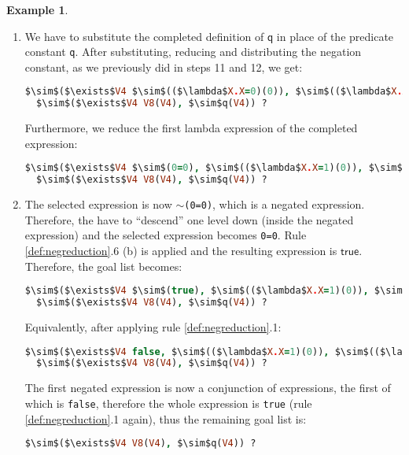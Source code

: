 \documentclass[inscr,ack,preface]{dithesis}
\theoremstyle{definition}
\newtheorem{example}{Example}[chapter]
\newcommand{\msf}[1]{$\mathsf{#1}$}
\begin{document}
\begin{example}
\begin{enumerate}
And after applying the unification, gives:
\begin{lstlisting}[language=Prolog,%
  frame=single,breaklines=false,mathescape=true]
  $\sim$($\exists$V4 $\sim$q(0)), $\sim$($\exists$V4 V8(V4), $\sim$q(V4)) ?
\end{lstlisting}

\item We have to substitute the completed definition of \msf{q} in place of the predicate constant \texttt{q}. After substituting, reducing and distributing the negation constant, as we previously did in steps 11 and 12, we get:
\begin{lstlisting}[language=Prolog,%
  frame=single,breaklines=false,mathescape=true]
  $\sim$($\exists$V4 $\sim$(($\lambda$X.X=0)(0)), $\sim$(($\lambda$X.X=1)(0)), $\sim$(($\lambda$X.X=2)(0))),
  $\sim$($\exists$V4 V8(V4), $\sim$q(V4)) ?
\end{lstlisting}

Furthermore, we reduce the first lambda expression of the completed expression:
\begin{lstlisting}[language=Prolog,%
  frame=single,breaklines=false,mathescape=true]
  $\sim$($\exists$V4 $\sim$(0=0), $\sim$(($\lambda$X.X=1)(0)), $\sim$(($\lambda$X.X=2)(0))),
  $\sim$($\exists$V4 V8(V4), $\sim$q(V4)) ?
\end{lstlisting}

\item The selected expression is now \texttt{$\sim$(0=0)}, which is a negated expression. Therefore, the have to ``descend'' one level down (inside the negated expression) and the selected expression becomes \texttt{0=0}. Rule \ref{def:negreduction}.6 (b) is applied and the resulting expression is \msf{true}. Therefore, the goal list becomes:
\begin{lstlisting}[language=Prolog,%
  frame=single,breaklines=false,mathescape=true]
  $\sim$($\exists$V4 $\sim$(true), $\sim$(($\lambda$X.X=1)(0)), $\sim$(($\lambda$X.X=2)(0))),
  $\sim$($\exists$V4 V8(V4), $\sim$q(V4)) ?
\end{lstlisting}

Equivalently, after applying rule \ref{def:negreduction}.1:
\begin{lstlisting}[language=Prolog,%
  frame=single,breaklines=false,mathescape=true]
  $\sim$($\exists$V4 false, $\sim$(($\lambda$X.X=1)(0)), $\sim$(($\lambda$X.X=2)(0))),
  $\sim$($\exists$V4 V8(V4), $\sim$q(V4)) ?
\end{lstlisting}

The first negated expression is now a conjunction of expressions, the first of which is \texttt{false}, therefore the whole expression is \texttt{true} (rule \ref{def:negreduction}.1 again), thus the remaining goal list is:
\begin{lstlisting}[language=Prolog,%
  frame=single,breaklines=false,mathescape=true]
  $\sim$($\exists$V4 V8(V4), $\sim$q(V4)) ?
\end{lstlisting}


\end{enumerate}
\end{example}
\end{document}
